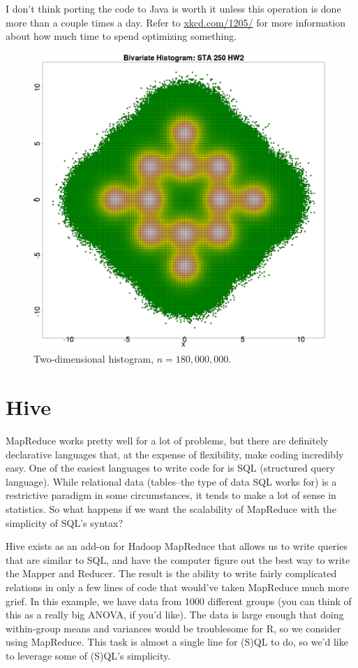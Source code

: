 \documentclass[12pt]{article}
\begin{document}
I don't think porting the code to Java is worth it unless this operation is done more than a couple times a day. Refer to \url{xkcd.com/1205/} for more information about how much time to spend optimizing something.

\begin{figure}[H] \center
\includegraphics[scale=.15]{Streaming/hist2d.png}
\caption*{Two-dimensional histogram, $n=180,000,000$.}
\end{figure}

\section*{Hive}
MapReduce works pretty well for a lot of problems, but there are definitely declarative languages that, at the expense of flexibility, make coding incredibly easy. One of the easiest languages to write code for is SQL (structured query language). While relational data (tables--the type of data SQL works for) is a restrictive paradigm in some circumstances, it tends to make a lot of sense in statistics. So what happens if we want the scalability of MapReduce with the simplicity of SQL's syntax?

Hive exists as an add-on for Hadoop MapReduce that allows us to write queries that are similar to SQL, and have the computer figure out the best way to write the Mapper and Reducer. The result is the ability to write fairly complicated relations in only a few lines of code that would've taken MapReduce much more grief. In this example, we have data from 1000 different groups (you can think of this as a really big ANOVA, if you'd like). The data is large enough that doing within-group means and variances would be troublesome for R, so we consider using MapReduce. This task is almost a single line for (S)QL to do, so we'd like to leverage some of (S)QL's simplicity. 
\end{document}

